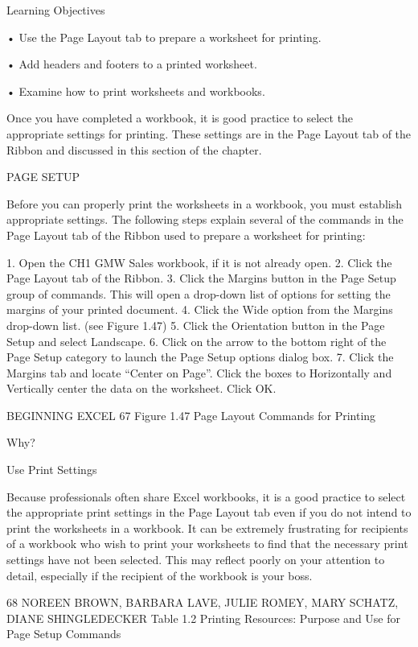 Learning Objectives


• Use the Page Layout tab to prepare a worksheet for printing.

• Add headers and footers to a printed worksheet.

• Examine how to print worksheets and workbooks.



Once you have completed a workbook, it is good practice to select the appropriate settings for
printing. These settings are in the Page Layout tab of the Ribbon and discussed in this section of the
chapter.

PAGE SETUP

Before you can properly print the worksheets in a workbook, you must establish appropriate settings.
The following steps explain several of the commands in the Page Layout tab of the Ribbon used to
prepare a worksheet for printing:

1. Open the CH1 GMW Sales workbook, if it is not already open.
2. Click the Page Layout tab of the Ribbon.
3. Click the Margins button in the Page Setup group of commands. This will open a drop-down
list of options for setting the margins of your printed document.
4. Click the Wide option from the Margins drop-down list. (see Figure 1.47)
5. Click the Orientation button in the Page Setup and select Landscape.
6. Click on the arrow to the bottom right of the Page Setup category to launch the Page Setup
options dialog box.
7. Click the Margins tab and locate “Center on Page”. Click the boxes to Horizontally and
Vertically center the data on the worksheet. Click OK.




BEGINNING EXCEL 67
Figure 1.47 Page Layout Commands for Printing




Why?

Use Print Settings

Because professionals often share Excel workbooks, it is a good practice to select the appropriate print settings in
the Page Layout tab even if you do not intend to print the worksheets in a workbook. It can be extremely frustrating
for recipients of a workbook who wish to print your worksheets to find that the necessary print settings have not
been selected. This may reflect poorly on your attention to detail, especially if the recipient of the workbook is your
boss.




68 NOREEN BROWN, BARBARA LAVE, JULIE ROMEY, MARY SCHATZ, DIANE SHINGLEDECKER
Table 1.2 Printing Resources: Purpose and Use for Page Setup Commands

